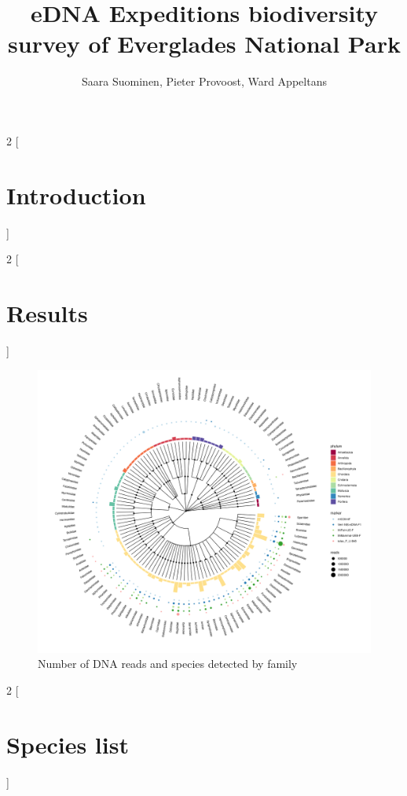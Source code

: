\documentclass[10pt]{article}
\title{eDNA Expeditions biodiversity survey of Everglades National Park}
\author{Saara Suominen, Pieter Provoost, Ward Appeltans}
\begin{document}
\maketitle

\begin{multicols}{2}
[\section{Introduction}]
\blindtext
\blindtext
\end{multicols}

\begin{multicols}{2}
[\section{Results}]
\blindtext
\blindtext
\end{multicols}

\begin{figure}[h]
\centering
\includegraphics[width=\textwidth]{tree}
\caption{Number of DNA reads and species detected by family}
\end{figure}

\begin{multicols}{2}
[\section{Species list}]
\end{multicols}


\end{document}

